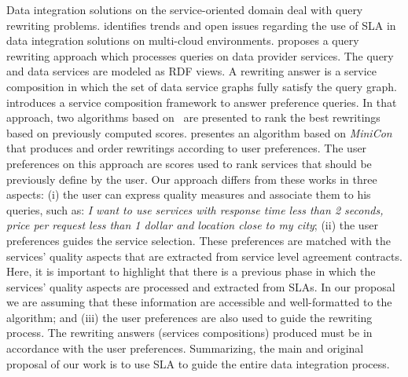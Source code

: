Data integration solutions on the 
service-oriented domain deal with query rewriting problems. \cite{Carvalho2015} identifies
trends and open issues regarding the use of SLA in data integration solutions on
multi-cloud environments.
%
\cite{Barhamgi2010} proposes a query rewriting approach 
which processes queries on data provider services.
The query and data services are modeled as RDF views.
A rewriting answer is a service composition in which 
the set of data service graphs fully satisfy the query graph.  
%
\cite{Benouaret2011} introduces a service composition
framework to answer preference queries. In that approach, two algorithms based
on~\cite{Barhamgi2010} are presented to rank the best rewritings based on previously computed scores.
%
\cite{ba2014} presentes an algorithm based on \textit{MiniCon} 
that produces and order rewritings according to user preferences. 
The user preferences on this approach are scores used to rank 
services that should be previously define by the user. 
%
Our approach differs from these works in three aspects:
(i) the user can express quality measures and associate them
to his queries, such as: \textit{I want to use services with response
time less than 2 seconds, price per request less than 1 dollar
and location close to my city}; 
(ii) the user preferences guides the service selection. 
These preferences are matched with the services' quality aspects
that are extracted from service level agreement contracts.
Here, it is important to highlight that there
is a previous phase in which the services' quality aspects are 
processed and extracted from SLAs. 
In our proposal we are assuming that these information are accessible and
well-formatted to the algorithm; and
(iii) the user preferences are also used to guide the rewriting process.
The rewriting answers (services compositions) produced must be in 
accordance with the user preferences.
%
Summarizing, the main and original proposal of our work is to use SLA to guide
the entire data integration process.
     
